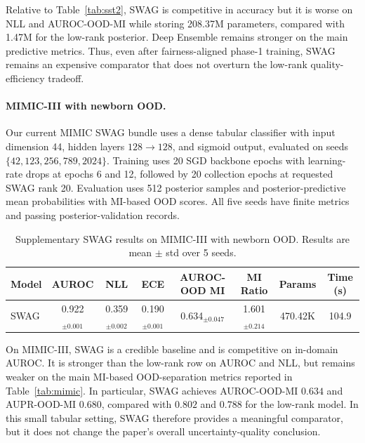 \documentclass{article}
\theoremstyle{plain}
\theoremstyle{definition}
\theoremstyle{remark}
\begin{document}
Relative to Table~\ref{tab:sst2}, SWAG is competitive in accuracy but it is worse on NLL and AUROC-OOD-MI while storing 208.37M parameters, compared with 1.47M for the low-rank posterior. Deep Ensemble remains stronger on the main predictive metrics. Thus, even after fairness-aligned phase-1 training, SWAG remains an expensive comparator that does not overturn the low-rank quality-efficiency tradeoff.

\paragraph{MIMIC-III with newborn OOD.}
Our current MIMIC SWAG bundle uses a dense tabular classifier with input dimension 44, hidden layers $128 \rightarrow 128$, and sigmoid output, evaluated on seeds $\{42,123,256,789,2024\}$. Training uses 20 SGD backbone epochs with learning-rate drops at epochs 6 and 12, followed by 20 collection epochs at requested SWAG rank 20. Evaluation uses 512 posterior samples and posterior-predictive mean probabilities with MI-based OOD scores. All five seeds have finite metrics and passing posterior-validation records.

\begin{table}[t]
\centering
\caption{Supplementary SWAG results on MIMIC-III with newborn OOD. Results are mean $\pm$ std over 5 seeds.}
\label{tab:swag_mimic}
\small
\begin{tabular}{lccccccc}
\toprule
\textbf{Model} & \textbf{AUROC} & \textbf{NLL} & \textbf{ECE} & \textbf{AUROC-OOD MI} & \textbf{MI Ratio} & \textbf{Params} & \textbf{Time (s)} \\
\midrule
SWAG & 0.922$_{\pm 0.001}$ & 0.359$_{\pm 0.002}$ & 0.190$_{\pm 0.001}$ & 0.634$_{\pm 0.047}$ & 1.601$_{\pm 0.214}$ & 470.42K & 104.9 \\
\bottomrule
\end{tabular}
\end{table}

On MIMIC-III, SWAG is a credible baseline and is competitive on in-domain AUROC. It is stronger than the low-rank row on AUROC and NLL, but remains weaker on the main MI-based OOD-separation metrics reported in Table~\ref{tab:mimic}. In particular, SWAG achieves AUROC-OOD-MI $0.634$ and AUPR-OOD-MI $0.680$, compared with $0.802$ and $0.788$ for the low-rank model. In this small tabular setting, SWAG therefore provides a meaningful comparator, but it does not change the paper's overall uncertainty-quality conclusion.
\end{document}
